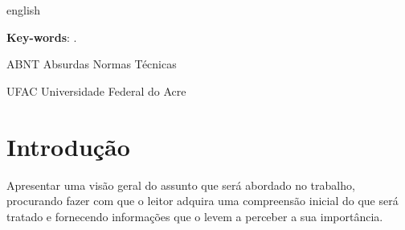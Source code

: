 \documentclass[
	12pt,				    %
	openright,			    %
	oneside,			    %
	a4paper,			    %
    sumario=tradicional,    %
	english,			    %
	brazil,				    %
	]{abntex2}
\begin{document}
\begin{resumo}[Abstract]
 \begin{otherlanguage*}{english}
   \noindent

   \vspace{\onelineskip}

   \noindent
   \textbf{Key-words}: .
 \end{otherlanguage*}
\end{resumo}

\listoffigures*
\cleardoublepage

\listoftables*
\cleardoublepage



\begin{siglas}
\item[ABNT] Absurdas Normas Técnicas
\item[UFAC] Universidade Federal do Acre
\end{siglas}




\tableofcontents*
\cleardoublepage



\textual


\chapter{Introdução}\label{sec:introducao} \thispagestyle{empty}
Apresentar uma visão geral do assunto que será abordado no trabalho, procurando fazer com que o leitor adquira uma compreensão inicial do que será tratado e fornecendo informações que o levem a perceber a sua importância.  
\end{document}
